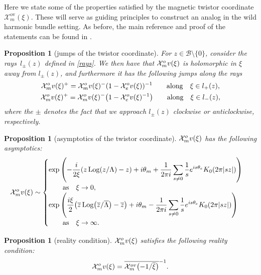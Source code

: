 \documentclass[11pt]{article}
\numberwithin{equation}{section}
\newtheorem{Proposition}[Theorem]{Proposition}
 { \theoremstyle{definition}
\newtheorem{Definition}[Theorem]{Definition}
\newtheorem{Notation}[Theorem]{Notation}
\newtheorem{Example}[Theorem]{Example}
\newtheorem{Remark}[Theorem]{Remark} }
\numberwithin{equation}{section}
\newcommand{\MC}{\mathcal{X}_m}
\begin{document}
Here we state some of the properties satisfied by the magnetic twistor coordinate $\MC^\text{ov}(\xi)$. These will serve as guiding principles to construct an analog in the wild harmonic bundle setting. As before, the main reference and proof of the statements can be found in \cite{GMN1}.

\begin{Proposition}[jumps of the twistor coordinate]\label{jumpsOV} For $z\in \mathcal{B}\setminus\{0\}$, consider the rays~$l_{\pm}(z)$ defined in \eqref{rays}. We then have that $\mathcal{X}_m^\textnormal{ov}(\xi)$ is holomorphic in $\xi$ away from $l_{\pm}(z)$, and furthermore it has the following jumps along the rays
\begin{gather*}
 \mathcal{X}_m^\textnormal{ov}(\xi)^{+}=\mathcal{X}_m^\textnormal{ov}(\xi)^{-}(1-\mathcal{X}_e^\textnormal{ov}(\xi))^{-1} \qquad \text{along} \quad \xi \in l_{+}(z),\\
 \mathcal{X}_m^\textnormal{ov}(\xi)^{+}=\mathcal{X}_m^\textnormal{ov}(\xi)^{-}\bigl(1-\mathcal{X}_e^\textnormal{ov}(\xi)^{-1}\bigr)\qquad \text{along} \quad \xi \in l_{-}(z),
\end{gather*}
where the $\pm$ denotes the fact that we approach $l_{\pm}(z)$ clockwise or anticlockwise, respectively.
\end{Proposition}

\begin{Proposition}[asymptotics of the twistor coordinate]\label{asympov} $\MC^\textnormal{ov}(\xi)$ has the following asymptotics:
\begin{gather}\label{aft}
 \MC^\textnormal{ov}(\xi) \sim
 \begin{cases}
\displaystyle \exp \left(-\frac{{\rm i}}{2\xi}(z \operatorname{Log}(z/\Lambda)-z) +{\rm i}\theta_m +\frac{1}{2\pi {\rm i}}\sum_{s\neq 0}\frac{1}{s}{\rm e}^{{\rm i}s\theta_e}K_0(2\pi |sz|) \right) \\ \qquad \text{as}\quad \xi \to 0,\\
\displaystyle \exp \left(\frac{{\rm i}\xi}{2}\bigl(\overline{z} \operatorname{Log}\bigl(\overline{z}/\overline{\Lambda}\bigr)-\overline{z}\bigr) +{\rm i}\theta_m -\frac{1}{2\pi {\rm i}}\sum_{s\neq 0}\frac{1}{s}{\rm e}^{{\rm i}s\theta_e}K_0(2\pi |sz|) \right)\\ \qquad\text{as} \quad \xi \to \infty.
 \end{cases}
\end{gather}
\end{Proposition}

\begin{Proposition}[reality condition] $\MC^\textnormal{ov}(\xi)$ satisfies the following reality condition:
\begin{equation}\label{rc}
 \MC^\textnormal{ov}(\xi)=\overline{\MC^{\textnormal{ov}}\bigl(-1/\overline{\xi}\bigr)}^{-1}.
\end{equation}
\end{Proposition}
\end{document}
